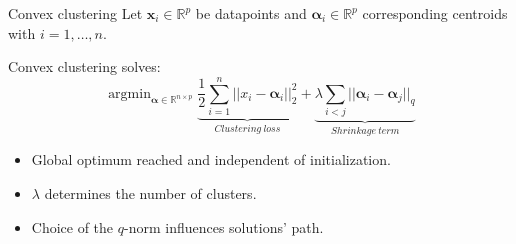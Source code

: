\documentclass[11pt]{beamer}
\newcommand{\emphase}[1]{\textcolor{Complement}{#1}}
\newcommand{\argmin}{\mathop{\mathrm{argmin}}}
\begin{document}
% 	

\begin{frame}{Convex clustering}
Let $\boldsymbol x_i \in \mathbb R^{p}$ be datapoints and $\boldsymbol \alpha_i \in \mathbb R^{p}$ corresponding centroids with $i=1, \dots, n.$

\emphase{Convex} clustering \citep{pelckmans2005convex, Hocking2011, Lindsten2011} solves:
\begin{equation*}
	\argmin_{\boldsymbol \alpha \in \mathbb R^{n\times p}} \underbrace{\frac{1}{2} \sum_{i=1}^n||x_i - \boldsymbol \alpha_i||_2^2}_{Clustering~loss} + \underbrace{\lambda \sum_{i < j} ||\boldsymbol \alpha_i - \boldsymbol \alpha_j||_q}_{Shrinkage~term}
\end{equation*}
\begin{itemize}
	\item Global optimum reached and independent of initialization.
	\item $\lambda$ determines the number of clusters.
	\item Choice of the $q$-norm influences solutions' path.
\end{itemize}
\end{frame}
\end{document}
